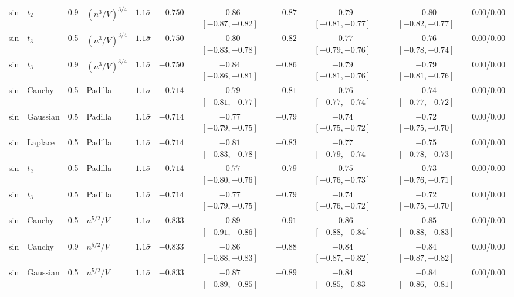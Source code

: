 \begin{longtable}{lllllcccccc}
sin & $t_2$ & 0.9 & $(n^3/V)^{3/4}$ & $1.1\bar\sigma$ & $-0.750$ & $-0.86$ {\scriptsize $[-0.87, -0.82]$} & $-0.87$ & $-0.79$ {\scriptsize $[-0.81, -0.77]$} & $-0.80$ {\scriptsize $[-0.82, -0.77]$} & 0.00/0.00 \\
sin & $t_3$ & 0.5 & $(n^3/V)^{3/4}$ & $1.1\bar\sigma$ & $-0.750$ & $-0.80$ {\scriptsize $[-0.83, -0.78]$} & $-0.82$ & $-0.77$ {\scriptsize $[-0.79, -0.76]$} & $-0.76$ {\scriptsize $[-0.78, -0.74]$} & 0.00/0.00 \\
sin & $t_3$ & 0.9 & $(n^3/V)^{3/4}$ & $1.1\bar\sigma$ & $-0.750$ & $-0.84$ {\scriptsize $[-0.86, -0.81]$} & $-0.86$ & $-0.79$ {\scriptsize $[-0.81, -0.76]$} & $-0.79$ {\scriptsize $[-0.81, -0.76]$} & 0.00/0.00 \\
sin & Cauchy & 0.5 & Padilla & $1.1\bar\sigma$ & $-0.714$ & $-0.79$ {\scriptsize $[-0.81, -0.77]$} & $-0.81$ & $-0.76$ {\scriptsize $[-0.77, -0.74]$} & $-0.74$ {\scriptsize $[-0.77, -0.72]$} & 0.00/0.00 \\
sin & Gaussian & 0.5 & Padilla & $1.1\bar\sigma$ & $-0.714$ & $-0.77$ {\scriptsize $[-0.79, -0.75]$} & $-0.79$ & $-0.74$ {\scriptsize $[-0.75, -0.72]$} & $-0.72$ {\scriptsize $[-0.75, -0.70]$} & 0.00/0.00 \\
sin & Laplace & 0.5 & Padilla & $1.1\bar\sigma$ & $-0.714$ & $-0.81$ {\scriptsize $[-0.83, -0.78]$} & $-0.83$ & $-0.77$ {\scriptsize $[-0.79, -0.74]$} & $-0.75$ {\scriptsize $[-0.78, -0.73]$} & 0.00/0.00 \\
sin & $t_2$ & 0.5 & Padilla & $1.1\bar\sigma$ & $-0.714$ & $-0.77$ {\scriptsize $[-0.80, -0.76]$} & $-0.79$ & $-0.75$ {\scriptsize $[-0.76, -0.73]$} & $-0.73$ {\scriptsize $[-0.76, -0.71]$} & 0.00/0.00 \\
sin & $t_3$ & 0.5 & Padilla & $1.1\bar\sigma$ & $-0.714$ & $-0.77$ {\scriptsize $[-0.79, -0.75]$} & $-0.79$ & $-0.74$ {\scriptsize $[-0.76, -0.72]$} & $-0.72$ {\scriptsize $[-0.75, -0.70]$} & 0.00/0.00 \\
sin & Cauchy & 0.5 & $n^{5/2}/V$ & $1.1\bar\sigma$ & $-0.833$ & $-0.89$ {\scriptsize $[-0.91, -0.86]$} & $-0.91$ & $-0.86$ {\scriptsize $[-0.88, -0.84]$} & $-0.85$ {\scriptsize $[-0.88, -0.83]$} & 0.00/0.00 \\
sin & Cauchy & 0.9 & $n^{5/2}/V$ & $1.1\bar\sigma$ & $-0.833$ & $-0.86$ {\scriptsize $[-0.88, -0.83]$} & $-0.88$ & $-0.84$ {\scriptsize $[-0.87, -0.82]$} & $-0.84$ {\scriptsize $[-0.87, -0.82]$} & 0.00/0.00 \\
sin & Gaussian & 0.5 & $n^{5/2}/V$ & $1.1\bar\sigma$ & $-0.833$ & $-0.87$ {\scriptsize $[-0.89, -0.85]$} & $-0.89$ & $-0.84$ {\scriptsize $[-0.85, -0.83]$} & $-0.84$ {\scriptsize $[-0.86, -0.81]$} & 0.00/0.00 \\

\end{longtable}
